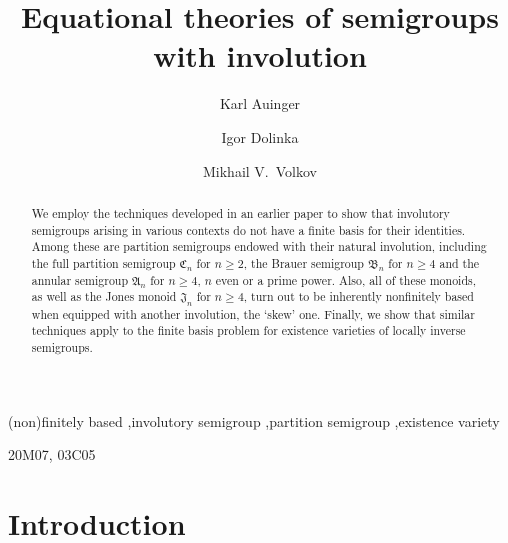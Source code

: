 \documentclass[preprint,1p,times]{elsarticle}
\numberwithin{equation}{section}
\theoremstyle{remark}
\def\A{\mathfrak{A}}
\def\C{\mathfrak{C}}
\def\B{\mathfrak{B}}
\def\J{\mathfrak{J}}
\begin{document}
\begin{frontmatter}

\title{Equational theories of semigroups with involution}

\author[ka]{Karl Auinger}
\author[id]{Igor Dolinka}
\author[mvv]{Mikhail V.\ Volkov}


\address[ka]{Fakult\"at f\"ur Mathematik, Universit\"at Wien, Nordbergstrasse 15,  A-1090 Wien, Austria}
\address[id]{Department of Mathematics and Informatics, University of Novi Sad, Trg Dositeja Obradovi\'ca 4,
21000 Novi Sad, Serbia}
\address[mvv]{Faculty of Mathematics and Mechanics, Ural State University, Lenina 51, 620083 Ekaterinburg, Russia}

\begin{abstract}
We employ the techniques developed in an earlier paper to show that involutory semigroups arising in various contexts
do not have a finite basis for their identities. Among these are partition semigroups endowed with their natural
involution, including the full partition semigroup $\C_n$ for $n\ge 2$, the Brauer semigroup $\B_n$ for $n\ge 4$ and
the annular semigroup $\A_n$ for $n\ge 4$, $n$ even or a prime power. Also, all of these monoids, as well as the Jones
monoid $\J_n$ for $n\ge 4$, turn out to be inherently nonfinitely based when equipped with another involution, the
`skew' one. Finally, we show that similar techniques apply to the finite basis problem for existence varieties of
locally inverse semigroups.
\end{abstract}

\begin{keyword}
(non)finitely based \sep involutory semigroup \sep partition semigroup \sep existence variety

\MSC[2010] 20M07, 03C05
\end{keyword}

\end{frontmatter}

\section*{Introduction}
\end{document}
